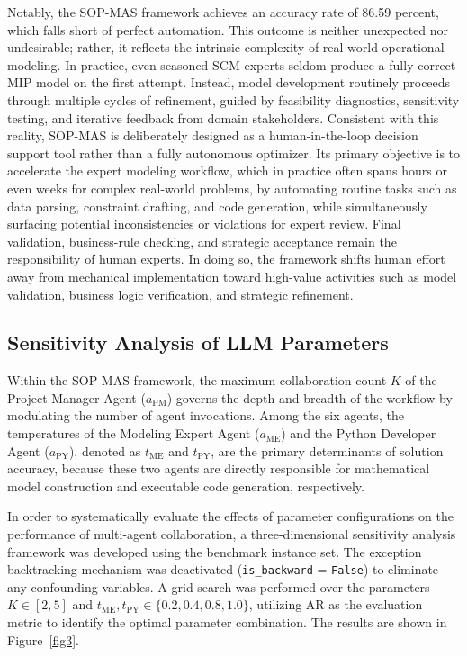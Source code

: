 \documentclass[preprint,12pt]{elsarticle}
\begin{document}
Notably, the SOP-MAS framework achieves an accuracy rate of 86.59 percent, which falls short of perfect automation. This outcome is neither unexpected nor undesirable; rather, it reflects the intrinsic complexity of real-world operational modeling. In practice, even seasoned SCM experts seldom produce a fully correct MIP model on the first attempt. Instead, model development routinely proceeds through multiple cycles of refinement, guided by feasibility diagnostics, sensitivity testing, and iterative feedback from domain stakeholders. Consistent with this reality, SOP-MAS is deliberately designed as a human-in-the-loop decision support tool rather than a fully autonomous optimizer. Its primary objective is to accelerate the expert modeling workflow, which in practice often spans hours or even weeks for complex real-world problems, by automating routine tasks such as data parsing, constraint drafting, and code generation, while simultaneously surfacing potential inconsistencies or violations for expert review. Final validation, business-rule checking, and strategic acceptance remain the responsibility of human experts. In doing so, the framework shifts human effort away from mechanical implementation toward high-value activities such as model validation, business logic verification, and strategic refinement.

\subsection{Sensitivity Analysis of LLM Parameters}

Within the SOP-MAS framework, the maximum collaboration count $K$ of the Project Manager Agent ($a_{\text{PM}}$) governs the depth and breadth of the workflow by modulating the number of agent invocations. Among the six agents, the temperatures of the Modeling Expert Agent ($a_{\text{ME}}$) and the Python Developer Agent ($a_{\text{PY}}$), denoted as $t_\text{ME}$ and $t_\text{PY}$, are the primary determinants of solution accuracy, because these two agents are directly responsible for mathematical model construction and executable code generation, respectively.

In order to systematically evaluate the effects of parameter configurations on the performance of multi-agent collaboration, a three-dimensional sensitivity analysis framework was developed using the benchmark instance set. The exception backtracking mechanism was deactivated (\texttt{is\_backward} = \texttt{False}) to eliminate any confounding variables. A grid search was performed over the parameters $K \in [2, 5]$ and $t_\text{ME}, t_\text{PY} \in \{0.2, 0.4, 0.8, 1.0\}$, utilizing AR as the evaluation metric to identify the optimal parameter combination. The results are shown in Figure~\ref{fig3}.
\end{document}
